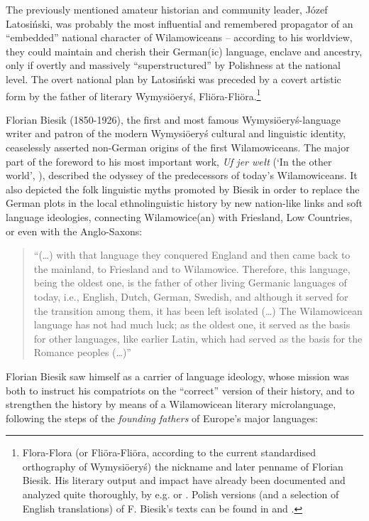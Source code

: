 \documentclass[output=paper]{langscibook}
\begin{document}
The previously mentioned amateur historian and community leader, Józef Latosiński, was probably the most influential and remembered propagator of an “embedded” national character of Wilamowiceans – according to his worldview, they could maintain and cherish their German(ic) language, enclave and ancestry, only if overtly and massively “superstructured” by Polishness at the national level. The overt national plan by Latosiński was preceded by a covert artistic form by the father of literary Wymysiöeryś, Fliöra-Fliöra.\footnote{Flora-Flora (or Fliöra-Fliöra, according to the current standardised orthography of Wymysiöeryś) the nickname and later penname of Florian Biesik. His literary output and impact have already been documented and analyzed quite thoroughly, by e.g. \citet{wicherkiewicz_making_2003, wicherkiewicz_researching_2016} or \citet{wicherkiewicz_mikroliteratura_2019}. Polish versions (and a selection of English translations) of F. Biesik’s texts can be found in \citet{wicherkiewicz_making_2003} and \citet{wicherkiewicz_mikroliteratura_2019}.}

Florian Biesik (1850-1926), the first and most famous Wymysiöeryś-language writer and patron of the modern Wymysiöeryś cultural and linguistic identity, ceaselessly asserted non-German origins of the first Wilamowiceans. The major part of the foreword to his most important work, \textit{Uf jer wełt} (‘In the other world’, \citeyear{biesik_welt_1924}), described the odyssey of the predecessors of today's Wilamowiceans. It also depicted the folk linguistic myths promoted by Biesik in order to replace the German plots in the local ethnolinguistic history by new nation-like links and soft language ideologies, connecting Wilamowice(an) with Friesland, Low Countries, or even with the Anglo-Saxons:

\begin{quote}
    “(\ldots) with that language they conquered England and then came back to the mainland, to Friesland and to Wilamowice. Therefore, this language, being the oldest one, is the father of other living Germanic languages of today, i.e., English, Dutch, German, Swedish, and although it served for the transition among them, it has been left isolated (\ldots) The Wilamowicean language has not had much luck; as the oldest one, it served as the basis for other languages, like earlier Latin, which had served as the basis for the Romance peoples (\ldots)”
\end{quote}

Florian Biesik saw himself as a carrier of language ideology, whose mission was both to instruct his compatriots on the “correct” version of their history, and to strengthen the history by means of a Wilamowicean literary microlanguage, following the steps of the \textit{founding fathers} of Europe’s major languages:
\end{document}
